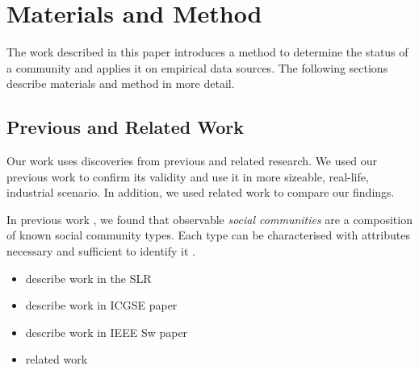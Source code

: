 \documentclass[conference]{IEEEtran}
\begin{document}
%
%
%

% 
%
%
%
%

\section{Materials and Method}\label{mm}
The work described in this paper introduces a method to determine the status of a community and applies it on empirical data sources. The following sections describe materials and method in more detail.

\subsection{Previous and Related Work}
Our work uses discoveries from previous and related research. We used our previous work to confirm its validity and use it in more sizeable, real-life, industrial scenario. In addition, we used related work to compare our findings.

In previous work \cite{icgseoss,ossslr}, we found that observable \emph{social communities} are a composition of known social community types. Each type can be characterised with attributes necessary and sufficient to identify it \cite{specissue}. 

\begin{itemize}
\item describe work in the SLR
\item describe work in ICGSE paper
\item describe work in IEEE Sw paper
\item related work
\end{itemize}
\end{document}

